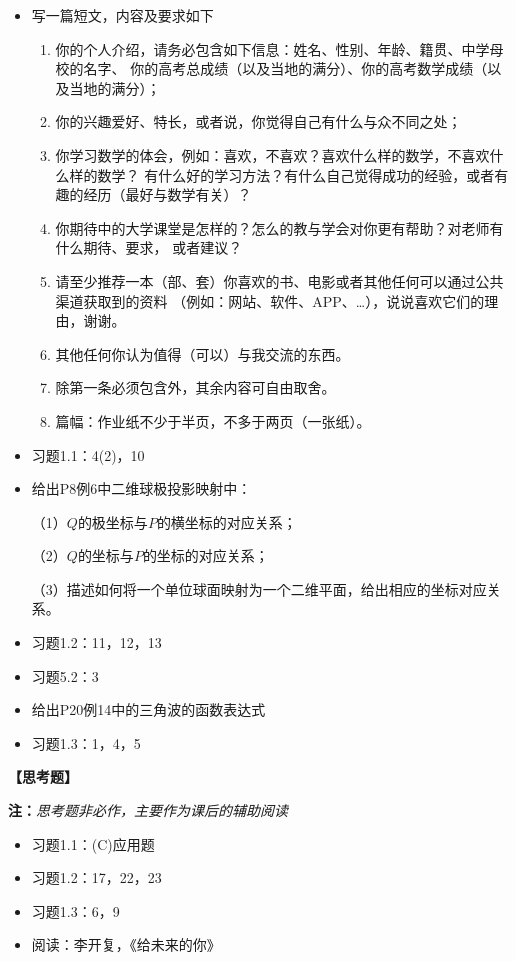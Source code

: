 \begin{itemize}
  \item 写一篇短文，内容及要求如下
  \begin{enumerate}[(1)]
    \item 你的个人介绍，请务必包含如下信息：姓名、性别、年龄、籍贯、中学母校的名字、
    你的高考总成绩（以及当地的满分）、你的高考数学成绩（以及当地的满分）；
    \item 你的兴趣爱好、特长，或者说，你觉得自己有什么与众不同之处；
    \item 你学习数学的体会，例如：喜欢，不喜欢？喜欢什么样的数学，不喜欢什么样的数学？
    有什么好的学习方法？有什么自己觉得成功的经验，或者有趣的经历（最好与数学有关）？
    \item 你期待中的大学课堂是怎样的？怎么的教与学会对你更有帮助？对老师有什么期待、要求，
    或者建议？
    \item 请至少推荐一本（部、套）你喜欢的书、电影或者其他任何可以通过公共渠道获取到的资料
    （例如：网站、软件、APP、\ldots），说说喜欢它们的理由，谢谢。
    \item 其他任何你认为值得（可以）与我交流的东西。
    \item 除第一条必须包含外，其余内容可自由取舍。
    \item 篇幅：作业纸不少于半页，不多于两页（一张纸）。
  \end{enumerate}
  \item 习题1.1：4(2)，10
  \item 给出P8例6中二维球极投影映射中：
  
  （1）$Q$的极坐标与$P$的横坐标的对应关系；
  
  （2）$Q$的坐标与$P$的坐标的对应关系；
  
  （3）描述如何将一个单位球面映射为一个二维平面，给出相应的坐标对应关系。
  \item 习题1.2：11，12，13
  \item 习题5.2：3
  \item 给出P20例14中的三角波的函数表达式
  \item 习题1.3：1，4，5
\end{itemize}

{\bf 【思考题】}

{\bf 注：}{\it 思考题非必作，主要作为课后的辅助阅读}

\begin{itemize}
  \item 习题1.1：(C)应用题
  \item 习题1.2：17，22，23
  \item 习题1.3：6，9
  \item 阅读：李开复，《给未来的你》
\end{itemize}